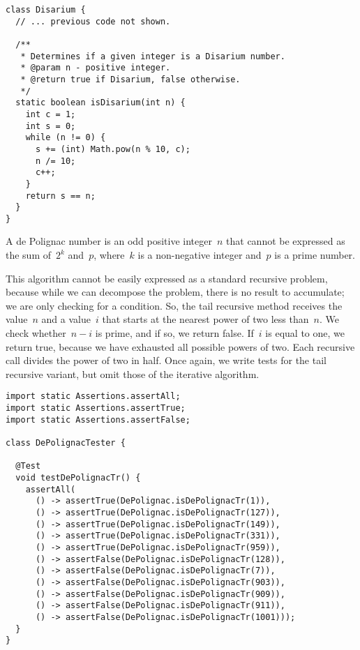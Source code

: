 \begin{lstlisting}[language=MyJava]
class Disarium {
  // ... previous code not shown.

  /**
   * Determines if a given integer is a Disarium number.
   * @param n - positive integer.
   * @return true if Disarium, false otherwise.
   */
  static boolean isDisarium(int n) {
    int c = 1;
    int s = 0;
    while (n != 0) {
      s += (int) Math.pow(n % 10, c);
      n /= 10;
      c++;
    }
    return s == n;
  }
}
\end{lstlisting}


A de Polignac number is an odd positive integer~$n$ that cannot be expressed as the sum of~$2^k$ and~$p$, where~$k$ is a non-negative integer and~$p$ is a prime number.

This algorithm cannot be easily expressed as a standard recursive problem, because while we can decompose the problem, there is no result to accumulate; we are only checking for a condition.
So, the tail recursive method receives the value~$n$ and a value~$i$ that starts at the nearest power of two less than~$n$.
We check whether~$n - i$ is prime, and if so, we return false.
If~$i$ is equal to one, we return true, because we have exhausted all possible powers of two.
Each recursive call divides the power of two in half.
Once again, we write tests for the tail recursive variant, but omit those of the iterative algorithm.

\begin{lstlisting}[language=MyJava]
import static Assertions.assertAll;
import static Assertions.assertTrue;
import static Assertions.assertFalse;

class DePolignacTester {

  @Test
  void testDePolignacTr() {
    assertAll(
      () -> assertTrue(DePolignac.isDePolignacTr(1)),
      () -> assertTrue(DePolignac.isDePolignacTr(127)),
      () -> assertTrue(DePolignac.isDePolignacTr(149)),
      () -> assertTrue(DePolignac.isDePolignacTr(331)),
      () -> assertTrue(DePolignac.isDePolignacTr(959)),
      () -> assertFalse(DePolignac.isDePolignacTr(128)),
      () -> assertFalse(DePolignac.isDePolignacTr(7)),
      () -> assertFalse(DePolignac.isDePolignacTr(903)),
      () -> assertFalse(DePolignac.isDePolignacTr(909)),
      () -> assertFalse(DePolignac.isDePolignacTr(911)),
      () -> assertFalse(DePolignac.isDePolignacTr(1001)));
  }
}
\end{lstlisting}

